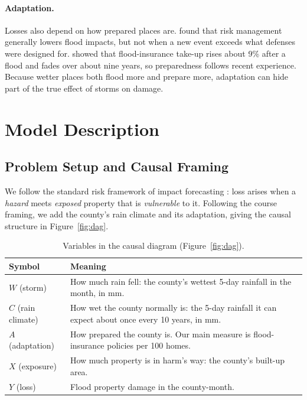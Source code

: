 \documentclass[10pt,twocolumn]{article}
\begin{document}
\paragraph{Adaptation.}
Losses also depend on how prepared places are. \citet{kreibich2022} found that risk management generally lowers flood impacts, but not when a new event exceeds what defenses were designed for. \citet{gallagher2013} showed that flood-insurance take-up rises about 9\% after a flood and fades over about nine years, so preparedness follows recent experience. Because wetter places both flood more and prepare more, adaptation can hide part of the true effect of storms on damage.

\section{Model Description}
\subsection{Problem Setup and Causal Framing}

We follow the standard risk framework of impact forecasting \citep{merz2020}: loss arises when a
\emph{hazard} meets \emph{exposed} property that is \emph{vulnerable} to it. Following the course
framing, we add the county's rain climate and its adaptation, giving the causal structure in
Figure~\ref{fig:dag}.

\begin{table}[H]
\centering
\small
\renewcommand{\arraystretch}{1.2}
\begin{tabularx}{\linewidth}{@{}lL@{}}
\toprule
Symbol & Meaning \\
\midrule
$W$ (storm)        & How much rain fell: the county's wettest 5-day rainfall in the month, in mm. \\
$C$ (rain climate) & How wet the county normally is: the 5-day rainfall it can expect about once every 10 years, in mm. \\
$A$ (adaptation)   & How prepared the county is. Our main measure is flood-insurance policies per 100 homes. \\
$X$ (exposure)     & How much property is in harm's way: the county's built-up area. \\
$Y$ (loss)         & Flood property damage in the county-month. \\
\bottomrule
\end{tabularx}
\caption{Variables in the causal diagram (Figure~\ref{fig:dag}).}
\label{tab:dag-vars}
\end{table}
\end{document}
